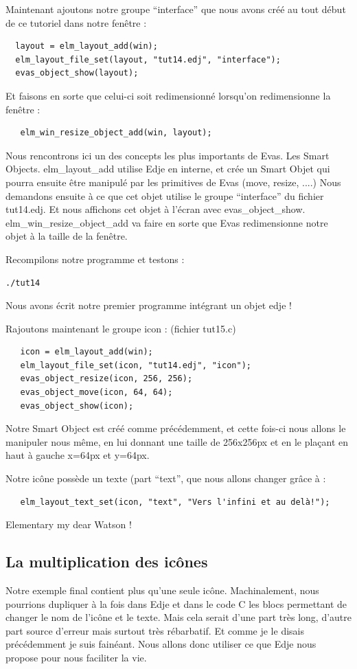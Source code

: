 \documentclass[a4paper]{efr}
\begin{document}
Maintenant ajoutons notre groupe ``interface'' que nous avons créé au tout
début de ce tutoriel dans notre fenêtre :

\begin{lstlisting}
  layout = elm_layout_add(win);
  elm_layout_file_set(layout, "tut14.edj", "interface");
  evas_object_show(layout);
\end{lstlisting}

Et faisons en sorte que celui-ci soit redimensionné lorsqu'on redimensionne la
fenêtre :
\begin{lstlisting}
   elm_win_resize_object_add(win, layout);
\end{lstlisting}

Nous rencontrons ici un des concepts les plus importants de Evas. Les Smart
Objects. elm\_layout\_add utilise Edje en interne, et crée un Smart Objet qui
pourra ensuite être manipulé par les primitives de Evas (move, resize, ....)
Nous demandons ensuite à ce que cet objet utilise le groupe ``interface'' du
fichier tut14.edj. Et nous affichons cet objet à l'écran avec
evas\_object\_show. elm\_win\_resize\_object\_add va faire en sorte que Evas
redimensionne notre objet à la taille de la fenêtre.

Recompilons notre programme et testons :
\begin{lstlisting}
./tut14
\end{lstlisting}

Nous avons écrit notre premier programme intégrant un objet edje !

Rajoutons maintenant le groupe icon : (fichier tut15.c)
\begin{lstlisting}
   icon = elm_layout_add(win);
   elm_layout_file_set(icon, "tut14.edj", "icon");
   evas_object_resize(icon, 256, 256);
   evas_object_move(icon, 64, 64);
   evas_object_show(icon);
\end{lstlisting}

Notre Smart Object est créé comme précédemment, et cette fois-ci nous allons
le manipuler nous même, en lui donnant une taille de 256x256px et en le
plaçant en haut à gauche x=64px et y=64px.

Notre icône possède un texte (part ``text'', que nous allons changer grâce à :
\begin{lstlisting}
   elm_layout_text_set(icon, "text", "Vers l'infini et au delà!");
\end{lstlisting}

Elementary my dear Watson !

\subsection{La multiplication des icônes}
Notre exemple final contient plus qu'une seule icône. Machinalement, nous
pourrions dupliquer à la fois dans Edje et dans le code C les blocs permettant
de changer le nom de l'icône et le texte. Mais cela serait d'une part très long,
d'autre part source d'erreur mais surtout très rébarbatif. Et comme je le disais précédemment
je suis fainéant. Nous allons donc utiliser ce que Edje nous propose pour nous
faciliter la vie.
\end{document}
